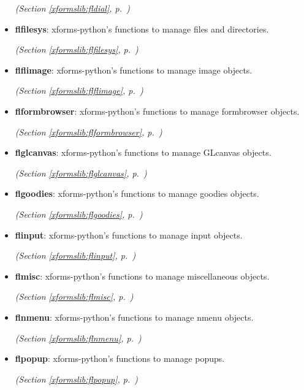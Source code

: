 \begin{itemize}
  \textit{(Section \ref{xformslib:fldial}, p.~\pageref{xformslib:fldial})}

\item \textbf{flfilesys}: 
xforms-python's functions to manage files and directories.


  \textit{(Section \ref{xformslib:flfilesys}, p.~\pageref{xformslib:flfilesys})}

\item \textbf{flflimage}: 
xforms-python's functions to manage image objects.


  \textit{(Section \ref{xformslib:flflimage}, p.~\pageref{xformslib:flflimage})}

\item \textbf{flformbrowser}: 
xforms-python's functions to manage formbrowser objects.


  \textit{(Section \ref{xformslib:flformbrowser}, p.~\pageref{xformslib:flformbrowser})}

\item \textbf{flglcanvas}: 
xforms-python's functions to manage GLcanvas objects.


  \textit{(Section \ref{xformslib:flglcanvas}, p.~\pageref{xformslib:flglcanvas})}

\item \textbf{flgoodies}: 
xforms-python's functions to manage goodies objects.


  \textit{(Section \ref{xformslib:flgoodies}, p.~\pageref{xformslib:flgoodies})}

\item \textbf{flinput}: 
xforms-python's functions to manage input objects.


  \textit{(Section \ref{xformslib:flinput}, p.~\pageref{xformslib:flinput})}

\item \textbf{flmisc}: 
xforms-python's functions to manage miscellaneous objects.


  \textit{(Section \ref{xformslib:flmisc}, p.~\pageref{xformslib:flmisc})}

\item \textbf{flnmenu}: 
xforms-python's functions to manage nmenu objects.


  \textit{(Section \ref{xformslib:flnmenu}, p.~\pageref{xformslib:flnmenu})}

\item \textbf{flpopup}: 
xforms-python's functions to manage popups.


  \textit{(Section \ref{xformslib:flpopup}, p.~\pageref{xformslib:flpopup})}


\end{itemize}
